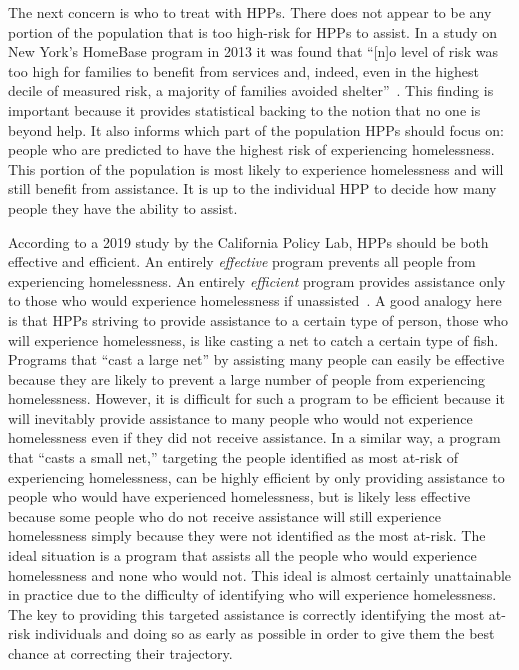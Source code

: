 \documentclass[10pt,letterpaper]{article}
\begin{document}
The next concern is who to treat with HPPs. There does not appear to be any portion of the population that is too high-risk for HPPs to assist. In a study on New York's HomeBase program in 2013 it was found that ``[n]o level of risk was too high for families to benefit from services and, indeed, even in the highest decile of measured risk, a majority of families avoided shelter''~\cite{shinn2013efficient}. This finding is important because it provides statistical backing to the notion that no one is beyond help. It also informs which part of the population HPPs should focus on: people who are predicted to have the highest risk of experiencing homelessness. This portion of the population is most likely to experience homelessness and will still benefit from assistance. It is up to the individual HPP to decide how many people they have the ability to assist.

According to a 2019 study by the California Policy Lab, HPPs should be both effective and efficient. An entirely \textit{effective} program prevents all people from experiencing homelessness. An entirely \textit{efficient} program provides assistance only to those who would experience homelessness if unassisted~\cite{von2019predicting}. A good analogy here is that HPPs striving to provide assistance to a certain type of person, those who will experience homelessness, is like casting a net to catch a certain type of fish. Programs that ``cast a large net'' by assisting many people can easily be effective because they are likely to prevent a large number of people from experiencing homelessness. However, it is difficult for such a program to be efficient because it will inevitably provide assistance to many people who would not experience homelessness even if they did not receive assistance. In a similar way, a program that ``casts a small net,'' targeting the people identified as most at-risk of experiencing homelessness, can be highly efficient by only providing assistance to people who would have experienced homelessness, but is likely less effective because some people who do not receive assistance will still experience homelessness simply because they were not identified as the most at-risk. The ideal situation is a program that assists all the people who would experience homelessness and none who would not. This ideal is almost certainly unattainable in practice due to the difficulty of identifying who will experience homelessness. The key to providing this targeted assistance is correctly identifying the most at-risk individuals and doing so as early as possible in order to give them the best chance at correcting their trajectory.
\end{document}
